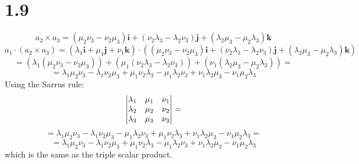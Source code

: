 \documentclass{article}
\begin{document}
\section*{1.9}

\begin{equation*}
    \textbf{\(a_2\)} \times \textbf{\(a_3\)} = (\mu_{2}\nu_{3} - \nu_{2}\mu_{3})\textbf{i} + (\nu_{2}\lambda_{3} - \lambda_{2}\nu_{3})\textbf{j} + (\lambda_{2}\mu_{3} - \mu_{2}\lambda_{3})\textbf{k}
\end{equation*}
\begin{equation*}
    \textbf{\(a_1\)} \cdot (\textbf{\(a_2\)} \times \textbf{\(a_3\)}) = (\lambda_1 \textbf{i} + \mu_1\textbf{j} +  \nu_1\textbf{k}) \cdot ((\mu_{2}\nu_{3} - \nu_{2}\mu_{3})\textbf{i} + (\nu_{2}\lambda_{3} - \lambda_{2}\nu_{3})\textbf{j} + (\lambda_{2}\mu_{3} - \mu_{2}\lambda_{3})\textbf{k})
\end{equation*}
\begin{equation*}
    = (\lambda_1(\mu_{2}\nu_{3} - \nu_{2}\mu_{3})) + (\mu_1(\nu_{2}\lambda_{3} - \lambda_{2}\nu_{3})) + (\nu_1(\lambda_{2}\mu_{3} - \mu_{2}\lambda_{3})) =
\end{equation*}
\begin{equation*}
    = \lambda_{1}\mu_{2}\nu_{3} - \lambda_{1}\nu_{2}\mu_{3} + \mu_{1}\nu_{2}\lambda_{3} - \mu_{1}\lambda_{2}\nu_{3} + \nu_{1}\lambda_{2}\mu_{3} - \nu_{1}\mu_{2}\lambda_{3}
\end{equation*}
Using the Sarrus rule:
\begin{equation*}
    \mdet{\lambda_1 & \mu_1 & \nu_1 \\ \lambda_2 & \mu_2 & \nu_2 \\ \lambda_3 & \mu_3 & \nu_3} =
\end{equation*}
\begin{equation*}
   = \lambda_{1}\mu_{2} \nu_{3} - \lambda_{1}\nu_{2} \mu_{3} - \mu_{1}\lambda_{2} \nu_{3} + \mu_{1}\nu_{2}\lambda_{3} + \nu_{1}\lambda_{2} \mu_{3} - \nu_{1}\mu_{2} \lambda_{3} =
\end{equation*}
\begin{equation*}
    = \lambda_{1}\mu_{2}\nu_{3} - \lambda_{1}\nu_{2}\mu_{3} + \mu_{1}\nu_{2}\lambda_{3} - \mu_{1}\lambda_{2}\nu_{3} + \nu_{1}\lambda_{2}\mu_{3} - \nu_{1}\mu_{2}\lambda_{3}
 \end{equation*}
which is the same as the triple scalar product.


\end{document}
